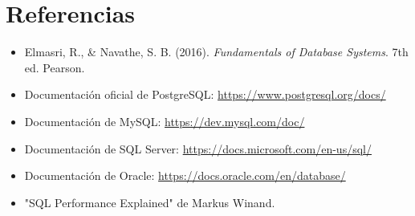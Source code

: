 \documentclass[12pt,a4paper,openany,oneside]{book}
\begin{document}
\chapter*{Referencias}
\begin{itemize}
    \item Elmasri, R., \& Navathe, S. B. (2016). \textit{Fundamentals of Database Systems}. 7th ed. Pearson.
    \item Documentación oficial de PostgreSQL: \url{https://www.postgresql.org/docs/}
    \item Documentación de MySQL: \url{https://dev.mysql.com/doc/}
    \item Documentación de SQL Server: \url{https://docs.microsoft.com/en-us/sql/}
    \item Documentación de Oracle: \url{https://docs.oracle.com/en/database/}
    \item "SQL Performance Explained" de Markus Winand.
\end{itemize}
\end{document}

